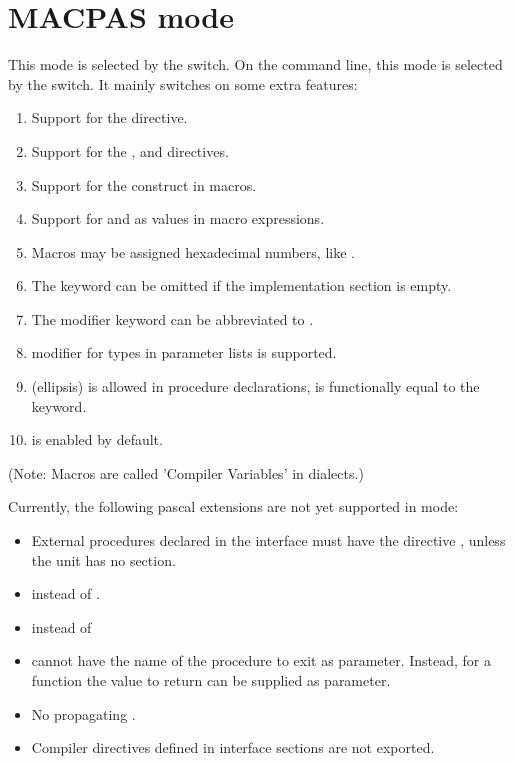 \section{MACPAS mode}
This mode is selected by the  switch. On the
command line, this mode is selected by the  switch. It mainly
switches on some extra features:
\begin{enumerate}
\item Support for the  directive.
\item Support for the ,  and 
directives.
\item Support for the  construct in macros.
\item Support for  and  as values in macro expressions.
\item Macros may be assigned hexadecimal numbers, like .
\item The  keyword can be omitted if the implementation
section is empty.
\item The  modifier keyword can be abbreviated to .
\item {} modifier for types in parameter lists is supported.
\item {} (ellipsis) is allowed in procedure declarations, is
functionally equal to the  keyword.
\item {} is enabled by default.
\end{enumerate}
(Note: Macros are called 'Compiler Variables' in \macos dialects.)

Currently, the following \macos pascal extensions are not yet supported in
 mode:
\begin{itemize}
\item External procedures declared in the interface must have the directive , unless the unit has no  section.
\item {} instead of .
\item {} instead of 
\item {} cannot have the name of the procedure to exit as parameter.
Instead, for a function the value to return can be supplied as parameter. 
\item No propagating .
\item Compiler directives defined in interface sections are not exported.
\end{itemize}

